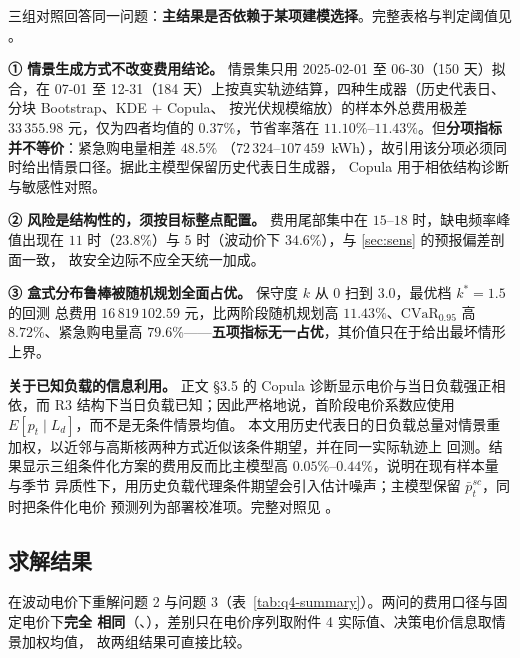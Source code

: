 三组对照回答同一问题：\textbf{主结果是否依赖于某项建模选择}。完整表格与判定阈值见
。

\textbf{① 情景生成方式不改变费用结论。} 情景集只用 2025-02-01 至 06-30（150 天）拟合，在 07-01 至
12-31（184 天）上按真实轨迹结算，四种生成器（历史代表日、分块 Bootstrap、KDE \(+\) Copula、
按光伏规模缩放）的样本外总费用极差 \(33\,355.98\) 元，仅为四者均值的 \(0.37\%\)，节省率落在
\(11.10\%\)--\(11.43\%\)。但\textbf{分项指标并不等价}：紧急购电量相差 \(48.5\%\)
（\(72\,324\)--\(107\,459\)~kWh），故引用该分项必须同时给出情景口径。据此主模型保留历史代表日生成器，
Copula 用于相依结构诊断与敏感性对照。

\textbf{② 风险是结构性的，须按目标整点配置。} 费用尾部集中在 \(15\)--\(18\) 时，缺电频率峰值出现在
\(11\) 时（\(23.8\%\)）与 \(5\) 时（波动价下 \(34.6\%\)），与 \ref{sec:sens} 的预报偏差剖面一致，
故安全边际不应全天统一加成。

\textbf{③ 盒式分布鲁棒被随机规划全面占优。} 保守度 \(k\) 从 0 扫到 3.0，最优档 \(k^{*}=1.5\) 的回测
总费用 \(16\,819\,102.59\) 元，比两阶段随机规划高 \(11.43\%\)、\(\mathrm{CVaR}_{0.95}\) 高
\(8.72\%\)、紧急购电量高 \(79.6\%\)——\textbf{五项指标无一占优}，其价值只在于给出最坏情形上界。

\textbf{关于已知负载的信息利用。} 正文 \S3.5 的 Copula 诊断显示电价与当日负载强正相依，而 R3
结构下当日负载已知；因此严格地说，首阶段电价系数应使用 \(E[p_t\mid L_d]\)，而不是无条件情景均值。
本文用历史代表日的日负载总量对情景重加权，以近邻与高斯核两种方式近似该条件期望，并在同一实际轨迹上
回测。结果显示三组条件化方案的费用反而比主模型高 \(0.05\%\)--\(0.44\%\)，说明在现有样本量与季节
异质性下，用历史负载代理条件期望会引入估计噪声；主模型保留 \(\bar p^{sc}_t\)，同时把条件化电价
预测列为部署校准项。完整对照见 。

\subsection{求解结果}

在波动电价下重解问题 2 与问题 3（表~\ref{tab:q4-summary}）。两问的费用口径与固定电价下\textbf{完全
相同}（、），差别只在电价序列取附件 4 实际值、决策电价信息取情景加权均值，
故两组结果可直接比较。

